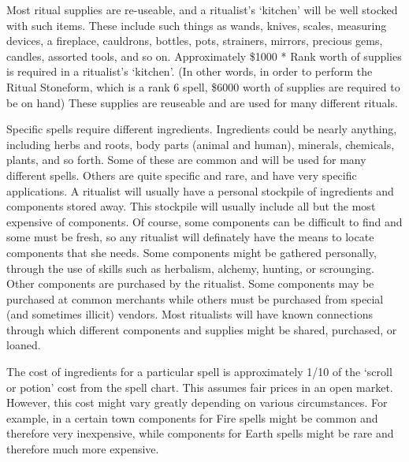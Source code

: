 \documentclass[twoside]{book}
\begin{document}
    {  
      Most ritual supplies are re-useable, and a
               ritualist's `kitchen' will be well
               stocked with such items. These include such things as
               wands, knives, scales, measuring devices, a fireplace,
               cauldrons, bottles, pots, strainers, mirrors, precious
               gems, candles, assorted tools, and so on. Approximately
               \$1000 * Rank worth of supplies is required in a
               ritualist's `kitchen'. (In other words,
               in order to perform the Ritual Stoneform, which is a rank
               6 spell, \$6000 worth of supplies are required to be on
               hand) These supplies are reuseable and are used for many
               different rituals. 
    }
  
    {  
      Specific spells require different ingredients.
               Ingredients could be nearly anything, including herbs and
               roots, body parts (animal and human), minerals, chemicals,
               plants, and so forth. Some of these are common and will be
               used for many different spells. Others are quite specific
               and rare, and have very specific applications. A ritualist
               will usually have a personal stockpile of ingredients and
               components stored away. This stockpile will usually
               include all but the most expensive of components. Of
               course, some components can be difficult to find and some
               must be fresh, so any ritualist will definately have the
               means to locate components that she needs. Some components
               might be gathered personally, through the use of skills
               such as herbalism, alchemy, hunting, or scrounging. Other
               components are purchased by the ritualist. Some components
               may be purchased at common merchants while others must be
               purchased from special (and sometimes illicit) vendors.
               Most ritualists will have known connections through which
               different components and supplies might be shared,
               purchased, or loaned. 
    }
  
    {  
      The cost of ingredients for a particular spell is
               approximately 1/10 of the `scroll or potion'
               cost from the spell chart. This assumes fair prices in an
               open market. However, this cost might vary greatly
               depending on various circumstances. For example, in a
               certain town components for Fire spells might be common
               and therefore very inexpensive, while components for Earth
               spells might be rare and therefore much more expensive.
               
    }
  
\end{document}
